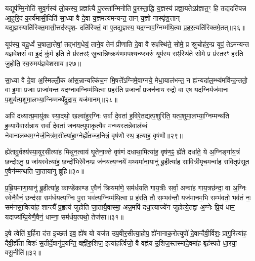 यद्यूप॑म्मि॒नोति॑ सुव॒र्गस्य॑ लो॒कस्य॒ प्रज्ञा᳚त्यै पु॒रस्ता᳚न्मिनोति पु॒रस्ता॒द्धि य॒ज्ञस्य॑ प्रज्ञा॒यते\-ऽप्र॑ज्ञात॒ꣳ॒ हि तद्यदति॑पन्न आ॒हुरि॒दं का॒र्य॑मासी॒दिति॑ सा॒ध्या वै दे॒वा य॒ज्ञमत्य॑मन्यन्त॒ तान् य॒ज्ञो नास्पृ॑श॒त्तान् यद्य॒ज्ञस्याति॑रिक्त॒मासी॒त्तद॑स्पृश॒- दति॑रिक्तं॒ वा ए॒तद्य॒ज्ञस्य॒ यद॒ग्नाव॒ग्निम्म॑थि॒त्वा प्र॒हर॒त्यति॑रिक्तमे॒तत्॥२६॥

यूप॑स्य॒ यदू॒र्ध्वं च॒षाला॒त्तेषां॒ तद्भा॑ग॒धेयं॒ ताने॒व तेन॑ प्रीणाति दे॒वा वै सꣴस्थि॑ते॒ सोमे॒ प्र स्रुचोह॑र॒न्प्र यूपं॒ ते॑\-ऽमन्यन्त यज्ञवेश॒सं वा इ॒दं कु॑र्म॒ इति॒ ते प्र॑स्त॒रꣴ स्रु॒चान्नि॒ष्क्रय॑णमपश्य॒न्थ्स्वरुं॒ यूप॑स्य॒ सꣴस्थि॑ते॒ सोमे॒ प्र प्र॑स्त॒रꣳ हर॑ति जु॒होति॒ स्व॒रुमय॑ज्ञवेशसाय॥२७॥

{}

सा॒ध्या वै दे॒वा अ॒स्मिल्लोँ॒क आ॑स॒न्नान्यत्किंच॒न मि॒षत्ते᳚\-ऽग्निमे॒वाग्नये॒ मेधा॒याल॑भन्त॒ न ह्य॑न्यदा॑ल॒म्भ्य॑मवि॑न्द॒न्ततो॒ वा इ॒माः प्र॒जाः प्राजा॑यन्त॒ यद॒ग्नाव॒ग्निम्म॑थि॒त्वा प्र॒हर॑ति प्र॒जानां᳚ प्र॒जन॑नाय रु॒द्रो वा ए॒ष यद॒ग्निर्यज॑मानः प॒शुर्यत्प॒शुमा॒लभ्या॒ग्निम्मन्थे᳚द्रु॒द्राय॒ यज॑मानम्॥२८॥

अपि॑ दध्यात्प्र॒मायु॑कः स्या॒दथो॒ खल्वा॑हुर॒ग्निः सर्वा॑ दे॒वता॑ ह॒विरे॒तद्यत्प॒शुरिति॒ यत्प॒शुमा॒लभ्या॒ग्निम्मन्थ॑ति ह॒व्यायै॒वास॑न्नाय॒ सर्वा॑ दे॒वता॑ जनयत्युपा॒कृत्यै॒व मन्थ्य॒स्तन्नेवाल॑ब्धं॒ नेवाना॑लब्धम॒ग्नेर्ज॒नित्र॑म॒सीत्या॑हा॒ग्नेर्\mbox{}ह्ये॑तज्ज॒नित्रं॒ वृष॑णौ स्थ॒ इत्या॑ह॒ वृष॑णौ॥२९॥

ह्ये॑तावु॒र्वश्य॑स्या॒युर॒सीत्या॑ह मिथुन॒त्वाय॑ घृ॒तेना॒क्ते वृष॑णं दधाथा॒मित्या॑ह॒ वृष॑ण॒ꣴ॒ ह्ये॑ते दधा॑ते॒ ये अ॒ग्निङ्गा॑य॒त्रं छन्दो\-ऽनु॒ प्र जा॑य॒स्वेत्या॑ह॒ छन्दो॑भिरे॒वैन॒म्प्र ज॑नयत्य॒ग्नये॑ म॒थ्यमा॑ना॒यानु॑ ब्रू॒हीत्या॑ह सावि॒त्रीमृच॒मन्वा॑ह सवि॒तृप्र॑सूत ए॒वैन॑म्मन्थति जा॒ताया॑नु ब्रूहि॥३०॥

प्र॒ह्रि॒यमा॑णा॒यानु॑ ब्रू॒हीत्या॑ह॒ काण्डे॑काण्ड ए॒वैनं॑ क्रियमा॑णे॒ सम॑र्धयति गाय॒त्रीः सर्वा॒ अन्वा॑ह गाय॒त्रछ॑न्दा॒ वा अ॒ग्निः स्वेनै॒वैनं॒ छन्द॑सा॒ सम॑र्धयत्य॒ग्निः पु॒रा भव॑त्य॒ग्निम्म॑थि॒त्वा प्र ह॑रति॒ तौ स॒म्भव॑न्तौ॒ यज॑मानम॒भि सम्भ॑वतो॒ भव॑तं नः॒ सम॑नसा॒वित्या॑ह॒ शान्त्यै᳚ प्र॒हृत्य॑ जुहोति जा॒तायै॒वास्मा॒ अन्न॒मपि॑ दधा॒त्याज्ये॑न जुहोत्ये॒तद्वा अ॒ग्नेः प्रि॒यं धाम॒ यदाज्य॑म्प्रि॒येणै॒वैनं॒ धाम्ना॒ सम॑र्धय॒त्यथो॒ तेज॑सा॥३१॥

{\anuvakamend[{यज॑मानमाह॒ वृष॑णौ जाता॒यानु॑ब्रू॒ह्यप्य॒ष्टाद॑श च॥५॥}]}

इ॒षे त्वेति॑ ब॒र्\mbox{}हिरा द॑त्त इ॒च्छत॑ इव॒ ह्ये॑ष यो यज॑त उप॒वीर॒सीत्या॒होप॒ ह्ये॑नानाक॒रोत्युपो॑ दे॒वान्दैवी॒र्विशः॒ प्रागु॒रित्या॑ह॒ दैवी॒र्\mbox{}ह्ये॑ता विशः॑ स॒तीर्दे॒वानु॑प॒यन्ति॒ वह्नी॑रु॒शिज॒ इत्या॑ह॒र्त्विजो॒ वै वह्न॑य उ॒शिज॒स्तस्मा॑दे॒वमा॑ह॒ बृह॑स्पते धा॒रया॒ वसू॒नीति॑॥३२॥

